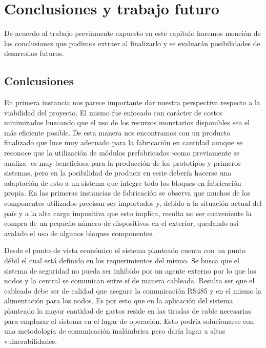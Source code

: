 \chapter{Conclusiones y trabajo futuro} \par

De acuerdo al trabajo previamente expuesto en este capítulo haremos mención de las conclusiones que pudimos extraer al 
finalizarlo y se evaluarán posibilidades de desarrollos futuros.  \par

\section{Conlcusiones} \par 

En primera instancia nos parece importante dar nuestra perspectiva respecto a la viabilidad del proyecto. El mismo fue
enfocado con carácter de costos minimizados buscando que el uso de los recursos monetarios disponibles sea el más eficiente
posible. De esta manera nos encontramos con un producto finalizado que luce muy adecuado para la fabricación en cantidad aunque 
se reconoce que la utilización de módulos prefabricados -como previamente se analiza- es muy beneficiosa para la producción
de los prototipos y primeros sistemas, pero en la posibilidad de producir en serie debería hacerse una adaptación de esto a
un sistema que integre todo los bloques en fabricación propia. En las primeras instancias de fabricación se observa que
muchos de los componentes utilizados precisan ser importados y, debido a la situación actual del país y a la alta carga impositiva
que esto implica, resulta no ser conveniente la compra de un pequeño número de dispositivos en el exterior, quedando así 
avalado el uso de algunos bloques componentes. \par 
Desde el punto de vista económico el sistema planteado cuenta con un punto débil el cual está definido en los requerimientos del
mismo. Se busca que el sistema de seguridad no pueda ser inhibido por un agente externo por lo que los nodos y 
la central se comunican entre sí de manera cableada. Resulta ser que el cableado debe ser de calidad que asegure la comunicación
RS485 y en el mismo la alimentación para los nodos. Es por esto que en la aplicación del sistema planteado la mayor 
cantidad de gastos reside en las tiradas de cable necesarias para emplazar el sistema en el lugar de operación. Esto podría
solucionarse con una metodología de comunicación inalámbrica pero daría lugar a altas vulnerabilidades. \par

